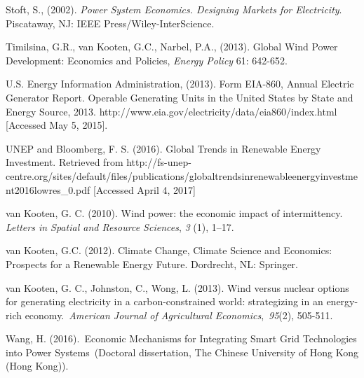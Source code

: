 Stoft, S., (2002). \emph{Power System Economics. Designing Markets for
Electricity}. Piscataway, NJ: IEEE Press/Wiley-InterScience.

Timilsina, G.R., van Kooten, G.C., Narbel, P.A., (2013). Global Wind
Power Development: Economics and Policies, \emph{Energy Policy} 61:
642-652.

U.S. Energy Information Administration, (2013). Form EIA-860, Annual
Electric Generator Report. Operable Generating Units in the United
States by State and Energy Source, 2013.
http://www.eia.gov/electricity/data/eia860/index.html {[}Accessed May 5,
2015{]}.

UNEP and Bloomberg, F. S. (2016). Global Trends in Renewable Energy
Investment. Retrieved from
http://fs-unep-centre.org/sites/default/files/publications/globaltrendsinrenewableenergyinvestment2016lowres\_0.pdf
{[}Accessed April 4, 2017{]}

van Kooten, G. C. (2010). Wind power: the economic impact of
intermittency. \emph{Letters in Spatial and Resource Sciences},
\emph{3} (1), 1--17.

van Kooten, G.C. (2012). Climate Change, Climate Science and Economics:
Prospects for a Renewable Energy Future. Dordrecht, NL: Springer.

van Kooten, G. C., Johnston, C., Wong, L. (2013). Wind versus nuclear
options for generating electricity in a carbon-constrained world:
strategizing in an energy-rich economy.~\emph{American Journal of
Agricultural Economics},~\emph{95}(2), 505-511.

Wang, H. (2016).~Economic Mechanisms for Integrating Smart Grid
Technologies into Power Systems~(Doctoral dissertation, The Chinese
University of Hong Kong (Hong Kong)).